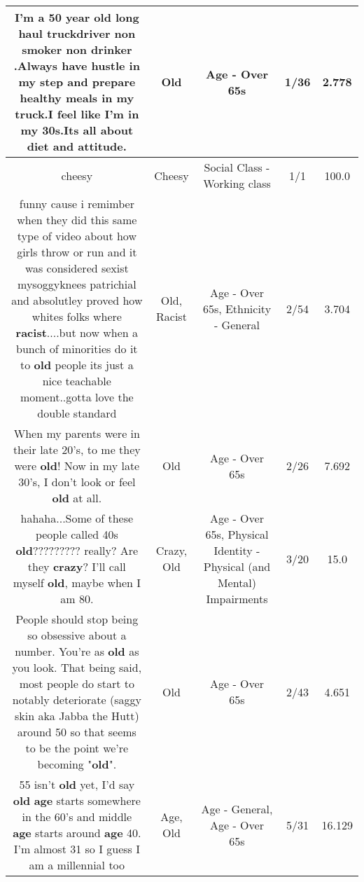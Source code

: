 \documentclass[11pt]{article}
\newlength\mylength
\begin{document}
\begin{center}
\begin{longtable}{|C{.65\mylength}|C{.30\mylength}|C{.12\mylength}|C{.12\mylength}|C{.12\mylength}|}
  \small I'm  a 50 year \textbf{old} long haul truckdriver non smoker non drinker .Always have hustle in my step and prepare healthy meals in my truck.I feel like I'm  in my 30s.Its all about diet and attitude.\normalsize   & Old & Age - Over 65s & 1/36 & 2.778 \\  \hline
  \small cheesy\normalsize   & Cheesy & Social Class - Working class & 1/1 & 100.0 \\  \hline
  \small funny cause i remimber when they did this same type of video about how girls throw or run and it was considered sexist mysoggyknees patrichial and absolutley proved how whites folks where \textbf{racist}....but now when a bunch of minorities do it to \textbf{old} people its just a nice teachable moment..gotta love the double standard\normalsize   & Old, Racist & Age - Over 65s, Ethnicity - General & 2/54 & 3.704 \\  \hline
  \small When my parents were in their late 20's, to me they were \textbf{old}! Now in my late 30's, I don't look or feel \textbf{old} at all.\normalsize   & Old & Age - Over 65s & 2/26 & 7.692 \\  \hline
  \small hahaha...Some of these people called 40s \textbf{old}?????????   really?  Are they \textbf{crazy}?  I'll call myself \textbf{old}, maybe when I am 80.\normalsize   & Crazy, Old & Age - Over 65s, Physical Identity - Physical (and Mental) Impairments & 3/20 & 15.0 \\  \hline
  \small People should stop being so obsessive about a number. You're as \textbf{old} as you look. That being said, most people do start to notably deteriorate (saggy skin aka Jabba the Hutt) around 50 so that seems to be the point we're becoming "\textbf{old}".\normalsize   & Old & Age - Over 65s & 2/43 & 4.651 \\  \hline
  \small 55 isn't \textbf{old} yet, I'd say \textbf{old} \textbf{age} starts somewhere in the 60's and middle \textbf{age} starts around \textbf{age} 40. I'm almost 31 so I guess I am a millennial too\normalsize   & Age, Old & Age - General, Age - Over 65s & 5/31 & 16.129 \\  \hline

\end{longtable}
\end{center}
\end{document}
